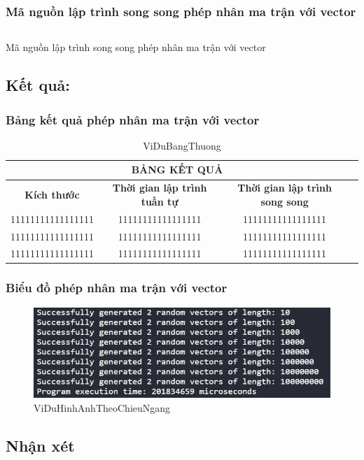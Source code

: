 \subsubsection{Mã nguồn lập trình song song phép nhân ma trận với vector}
\begin{listing}[H]
 \centering
 \inputminted{cpp}{sources/MaNguon1SS.cpp}
 \caption{Mã nguồn lập trình song song phép nhân ma trận với vector}
 \label{code:MaNguon1SS}
\end{listing} 
\newpage
\subsection{Kết quả:}
\subsubsection{Bảng kết quả phép nhân ma trận với vector}




 
\begin{table}[h] %
 \centering
 \begin{tabular}{|c|c|c|c|}
 
 \hline
 \multicolumn{3}{|c|}{\textbf{BẢNG KẾT QUẢ}} \\ 
 \hline
 \textbf{Kích thước} & \textbf{Thời gian lập trình tuần tự} & \textbf{Thời gian lập trình song song} \\ \hline
 11111111111111111 & 11111111111111111 & 11111111111111111 \\ \hline
 11111111111111111 & 11111111111111111 & 11111111111111111 \\ \hline
 11111111111111111 & 11111111111111111 & 11111111111111111 \\ \hline
 \end{tabular}

 \caption{ViDuBangThuong} %
 \label{table:nghia1} %
 \end{table} 
 
 
 
\subsubsection{Biểu đồ phép nhân ma trận với vector}

 
\begin{figure}[h] %
 \centering
 \includegraphics[width=1\textwidth]{pictures/image.png} %
 \caption{ViDuHinhAnhTheoChieuNgang} %
 \label{pictures:nghia12} %
 \end{figure} 
 

\subsection{Nhận xét}
\lipsum[1]



